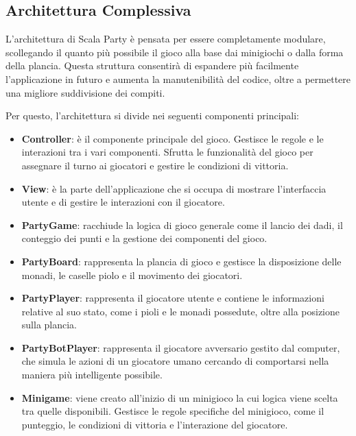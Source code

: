 \subsection{Architettura Complessiva} \label{sec:overall-architecture}
L'architettura di Scala Party è pensata per essere completamente modulare, scollegando 
il quanto più possibile il gioco alla base dai minigiochi o dalla forma della 
plancia. Questa struttura consentirà di espandere più facilmente l'applicazione in futuro e 
aumenta la manutenibilità del codice, oltre a permettere una migliore suddivisione dei 
compiti.

Per questo, l'architettura si divide nei seguenti componenti principali:
\begin{itemize}
    \item \textbf{Controller}: è il componente principale del gioco. Gestisce le
    regole e le interazioni tra i vari componenti. Sfrutta le funzionalità del gioco
    per assegnare il turno ai giocatori e gestire le condizioni di vittoria.
    \item \textbf{View}: è la parte dell'applicazione che si occupa di mostrare
    l'interfaccia utente e di gestire le interazioni con il giocatore.
    \item \textbf{PartyGame}: racchiude la logica di gioco generale
    come il lancio dei dadi, il conteggio dei punti e la gestione dei componenti del gioco.
    \item \textbf{PartyBoard}: rappresenta la plancia di gioco e gestisce la disposizione
    delle monadi, le caselle piolo e il movimento dei giocatori.
    \item \textbf{PartyPlayer}: rappresenta il giocatore utente e contiene le informazioni
    relative al suo stato, come i pioli e le monadi possedute, oltre alla posizione sulla
    plancia.
    \item \textbf{PartyBotPlayer}: rappresenta il giocatore avversario gestito dal computer, 
    che simula le azioni di un giocatore umano cercando di comportarsi nella maniera
    più intelligente possibile.
    \item \textbf{Minigame}: viene creato all'inizio di un minigioco la cui logica viene
    scelta tra quelle disponibili. Gestisce le regole specifiche del
    minigioco, come il punteggio, le condizioni di vittoria e l'interazione del giocatore.
\end{itemize}

